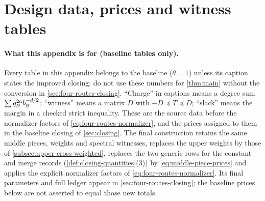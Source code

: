\providecommand{\PushA}{\frac{5422587}{6103515625}}
\providecommand{\PushExponent}{\frac{5422587}{433349609375}}
\providecommand{\PushDecimal}{1.25131923109859\ldots\cdot10^{-5}}
\providecommand{\PushK}{890666}
\providecommand{\FurtherT}{\frac{127}{500}}
\providecommand{\PushTheta}{0.99999999997327}
\providecommand{\FurtherPthree}{167\cdot2^{40}}

\section{Design data, prices and witness tables}\label{app:data}

\paragraph{What this appendix is for (baseline tables only).}
Every table in this appendix belongs to the baseline
($\theta=1$) unless its caption states the improved closing; do
not use these numbers for \cref{thm:main} without the conversion in
\cref{sec:four-routes-closing}. ``Charge'' in captions means a
degree sum $\sum q_{\mathcal B}^{2a}b_{\mathcal B}^{-d/2}$; ``witness'' means a
matrix $D$ with $-D\preceq T\preceq D$; ``slack'' means the margin
in a checked strict inequality. These are the source data before
the normalizer factors of \eqref{eq:four-routes-normalizer}, and
the prices assigned to them in the baseline closing of
\cref{sec:closing}.
The final construction retains the same middle pieces, weights and spectral
witnesses, replaces the upper weights by those of
\cref{subsec:upper-cross-weighted}, replaces the two generic rows for the constant and
merge records (\cref{def:closing-quantities}(3)) by
\eqref{eq:middle-piece-prices} and applies the explicit normalizer factors
of \eqref{eq:four-routes-normalizer}. Its final parameters and full
ledger appear in \cref{sec:four-routes-closing}; the baseline prices
below are not asserted to equal those new totals.

